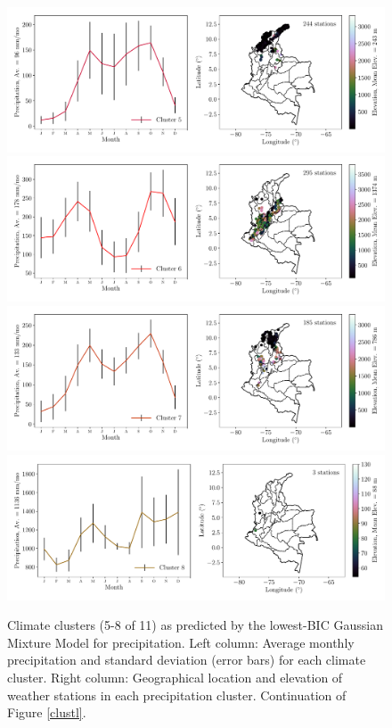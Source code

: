 \documentclass[a4paper,fleqn,usenatbib]{mnras}
\begin{document}
\begin{figure}
\begin{center}
\includegraphics[scale=0.5,trim={0 17 0 18},clip]{gmml4.pdf}
\includegraphics[scale=0.5,trim={0 17 0 18},clip]{gmml5.pdf}
\includegraphics[scale=0.5,trim={0 17 0 18},clip]{gmml6.pdf}
\includegraphics[scale=0.5,trim={0 17 0 18},clip]{gmml7.pdf}
\caption{Climate clusters  (5-8 of 11) as predicted by the lowest-BIC Gaussian Mixture Model for precipitation. Left column: Average monthly precipitation and standard deviation (error bars) for each climate cluster. Right column: Geographical location and elevation of weather stations in each precipitation cluster. Continuation of Figure \ref{clustl}.}\label{clustl2}
\end{center}
\end{figure}
\end{document}
